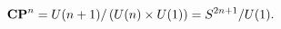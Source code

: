 \begin{equation}
{\bf CP}^n=U(n+1)/\left(U(n)\times U(1)\right)=S^{2n+1}/U(1).
\label{facx}
\end{equation}

